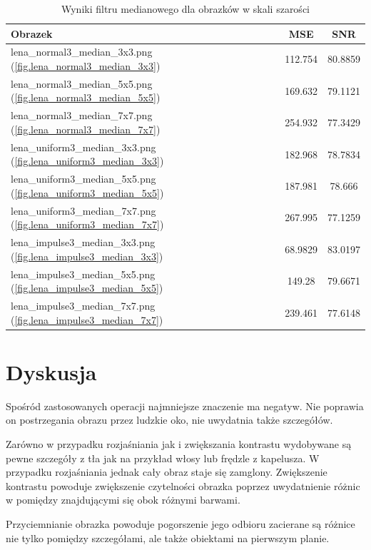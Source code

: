 \documentclass{classrep}
\begin{document}
\begin{table}
  \centering
  \begin{tabular}{|l|c|c|}
    \hline
    \textbf{Obrazek} & \textbf{MSE} & \textbf{SNR} \\
    \hline\hline
    lena\_normal3\_median\_3x3.png (\ref{fig.lena_normal3_median_3x3}) & 112.754 & 80.8859 \\
    \hline
    lena\_normal3\_median\_5x5.png (\ref{fig.lena_normal3_median_5x5}) & 169.632 & 79.1121 \\
    \hline
    lena\_normal3\_median\_7x7.png (\ref{fig.lena_normal3_median_7x7}) & 254.932 & 77.3429 \\
    \hline
    lena\_uniform3\_median\_3x3.png (\ref{fig.lena_uniform3_median_3x3}) & 182.968 & 78.7834 \\
    \hline
    lena\_uniform3\_median\_5x5.png (\ref{fig.lena_uniform3_median_5x5}) & 187.981 & 78.666 \\
    \hline
    lena\_uniform3\_median\_7x7.png (\ref{fig.lena_uniform3_median_7x7}) & 267.995 & 77.1259 \\
    \hline
    lena\_impulse3\_median\_3x3.png (\ref{fig.lena_impulse3_median_3x3}) & 68.9829 & 83.0197 \\
    \hline
    lena\_impulse3\_median\_5x5.png (\ref{fig.lena_impulse3_median_5x5}) & 149.28 & 79.6671 \\
    \hline
    lena\_impulse3\_median\_7x7.png (\ref{fig.lena_impulse3_median_7x7}) & 239.461 & 77.6148 \\
    \hline
  \end{tabular}
  \caption{Wyniki filtru medianowego dla obrazków w skali szarości}
  \label{tab.lena_median}
\end{table}

\section{Dyskusja}
Spośród zastosowanych operacji najmniejsze znaczenie ma negatyw. Nie poprawia on postrzegania obrazu przez ludzkie oko, nie uwydatnia także szczegółów.

Zarówno w przypadku rozjaśniania jak i zwiększania kontrastu wydobywane są pewne szczegóły z tła \ppauza jak na przykład włosy lub frędzle z kapelusza. W przypadku rozjaśniania jednak cały obraz staje się zamglony. Zwiększenie kontrastu powoduje zwiększenie czytelności obrazka poprzez uwydatnienie różnic w pomiędzy znajdującymi się obok różnymi barwami.

Przyciemnianie obrazka powoduje pogorszenie jego odbioru \ppauza zacierane są różnice nie tylko pomiędzy szczegółami, ale także obiektami na pierwszym planie.
\end{document}
